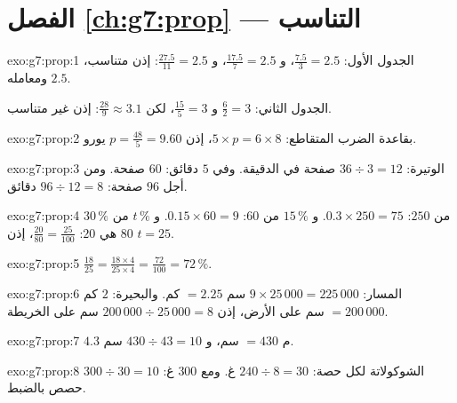 \section*{الفصل \ref{ch:g7:prop} --- التناسب}

\begin{solution}{exo:g7:prop:1}
الجدول الأول:  $\frac{7.5}{3} = 2.5$،
و $\frac{17.5}{7} = 2.5$، و $\frac{27.5}{11} = 2.5$: إذن متناسب،
ومعامله $2.5$.

الجدول الثاني: $\frac62 = 3$ و $\frac{15}{5} = 3$، لكن
$\frac{28}{9} \approx 3.1$: إذن غير متناسب.
\end{solution}

\begin{solution}{exo:g7:prop:2}
بقاعدة الضرب المتقاطع: $5 \times p = 6 \times 8$، إذن
$p = \frac{48}{5} = 9.60$ يورو.
\end{solution}

\begin{solution}{exo:g7:prop:3}
الوتيرة: $36 \div 3 = 12$ صفحة في الدقيقة. وفي $5$ دقائق:
$60$ صفحة. ومن أجل $96$ صفحة: $96 \div 12 = 8$ دقائق.
\end{solution}

\begin{solution}{exo:g7:prop:4}
$30\,\%$ من $250$: $0.3 \times 250 = 75$. \quad
و $15\,\%$ من $60$: $0.15 \times 60 = 9$. \quad
و $t\,\%$ من $80$ هي $20$: $\frac{20}{80} = \frac{25}{100}$، إذن
$t = 25$.
\end{solution}

\begin{solution}{exo:g7:prop:5}
$\frac{18}{25} = \frac{18 \times 4}{25 \times 4} = \frac{72}{100} =
72\,\%$.
\end{solution}

\begin{solution}{exo:g7:prop:6}
المسار: $9 \times 25\,000 = 225\,000$ سم $= 2.25$ كم.
والبحيرة: $2$ كم $= 200\,000$ سم على الأرض، إذن
$200\,000 \div 25\,000 = 8$ سم على الخريطة.
\end{solution}

\begin{solution}{exo:g7:prop:7}
$4.3$ م $= 430$ سم، و $430 \div 43 = 10$ سم.
\end{solution}

\begin{solution}{exo:g7:prop:8}
الشوكولاتة لكل حصة: $240 \div 8 = 30$ غ. ومع $300$ غ:
$300 \div 30 = 10$ حصص بالضبط.
\end{solution}

